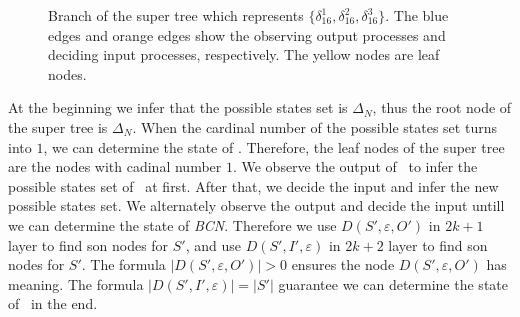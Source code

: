   \begin{figure}[thpb]
      \centering
      
      \caption{Branch of the super tree which represents $\{\delta_{16}^1,\delta_{16}^2,\delta_{16}^3\}$. The blue edges and orange edges show the observing output processes and deciding input processes, respectively. The yellow nodes are leaf nodes.}
      \label{fig:3}
   \end{figure}

At the beginning we infer that the possible states set is $\Delta_N$, thus the root node of the super tree is $\Delta_N$. When the cardinal number of the possible states set turns into $1$, we can determine the state of \BCN. Therefore, the leaf nodes of the super tree are the nodes with cadinal number $1$. We observe the output of \BCN\ to infer the possible states set of \BCN\ at first. After that, we decide the input and infer the new possible states set. We alternately observe the output and decide the input untill we can determine the state of {\em BCN}. Therefore we use $D\left(S',\varepsilon, O'\right)$ in $2k+1$ layer to find son nodes for $S'$, and use $D\left(S',I',\varepsilon\right)$ in $2k+2$ layer to find son nodes for $S'$. The formula $|D\left(S',\varepsilon, O'\right)|>0$ ensures the node $D\left(S',\varepsilon, O'\right)$ has meaning. The formula $|D\left(S',I',\varepsilon\right)|=|S'|$ guarantee we can determine the state of \BCN\ in the end. 

